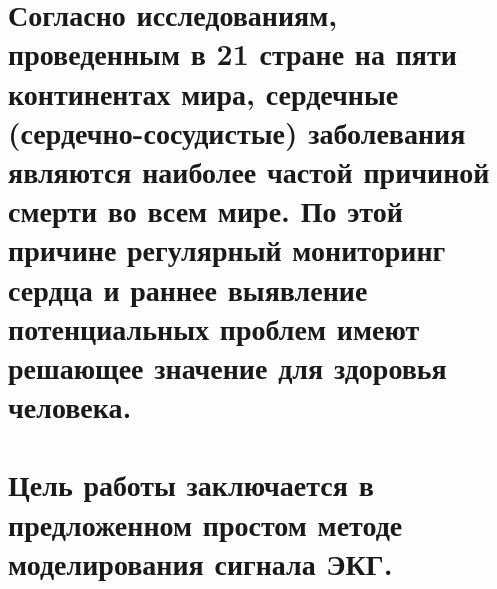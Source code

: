 \documentclass[
]{article}
\begin{document}
\section{\texorpdfstring{Согласно исследованиям, проведенным в 21 стране
на пяти континентах мира, сердечные (сердечно-сосудистые) заболевания
являются наиболее частой причиной смерти во всем мире. По этой причине
регулярный мониторинг сердца и раннее выявление потенциальных проблем
имеют решающее значение для здоровья человека.
}{Согласно исследованиям, проведенным в 21 стране на пяти континентах мира, сердечные (сердечно-сосудистые) заболевания являются наиболее частой причиной смерти во всем мире. По этой причине регулярный мониторинг сердца и раннее выявление потенциальных проблем имеют решающее значение для здоровья человека. }}\label{ux441ux43eux433ux43bux430ux441ux43dux43e-ux438ux441ux441ux43bux435ux434ux43eux432ux430ux43dux438ux44fux43c-ux43fux440ux43eux432ux435ux434ux435ux43dux43dux44bux43c-ux432-21-ux441ux442ux440ux430ux43dux435-ux43dux430-ux43fux44fux442ux438-ux43aux43eux43dux442ux438ux43dux435ux43dux442ux430ux445-ux43cux438ux440ux430-ux441ux435ux440ux434ux435ux447ux43dux44bux435-ux441ux435ux440ux434ux435ux447ux43dux43e-ux441ux43eux441ux443ux434ux438ux441ux442ux44bux435-ux437ux430ux431ux43eux43bux435ux432ux430ux43dux438ux44f-ux44fux432ux43bux44fux44eux442ux441ux44f-ux43dux430ux438ux431ux43eux43bux435ux435-ux447ux430ux441ux442ux43eux439-ux43fux440ux438ux447ux438ux43dux43eux439-ux441ux43cux435ux440ux442ux438-ux432ux43e-ux432ux441ux435ux43c-ux43cux438ux440ux435.-ux43fux43e-ux44dux442ux43eux439-ux43fux440ux438ux447ux438ux43dux435-ux440ux435ux433ux443ux43bux44fux440ux43dux44bux439-ux43cux43eux43dux438ux442ux43eux440ux438ux43dux433-ux441ux435ux440ux434ux446ux430-ux438-ux440ux430ux43dux43dux435ux435-ux432ux44bux44fux432ux43bux435ux43dux438ux435-ux43fux43eux442ux435ux43dux446ux438ux430ux43bux44cux43dux44bux445-ux43fux440ux43eux431ux43bux435ux43c-ux438ux43cux435ux44eux442-ux440ux435ux448ux430ux44eux449ux435ux435-ux437ux43dux430ux447ux435ux43dux438ux435-ux434ux43bux44f-ux437ux434ux43eux440ux43eux432ux44cux44f-ux447ux435ux43bux43eux432ux435ux43aux430.}

\section{Цель работы заключается в предложенном простом методе
моделирования сигнала
ЭКГ.}\label{ux446ux435ux43bux44c-ux440ux430ux431ux43eux442ux44b-ux437ux430ux43aux43bux44eux447ux430ux435ux442ux441ux44f-ux432-ux43fux440ux435ux434ux43bux43eux436ux435ux43dux43dux43eux43c-ux43fux440ux43eux441ux442ux43eux43c-ux43cux435ux442ux43eux434ux435-ux43cux43eux434ux435ux43bux438ux440ux43eux432ux430ux43dux438ux44f-ux441ux438ux433ux43dux430ux43bux430-ux44dux43aux433.}
\end{document}
